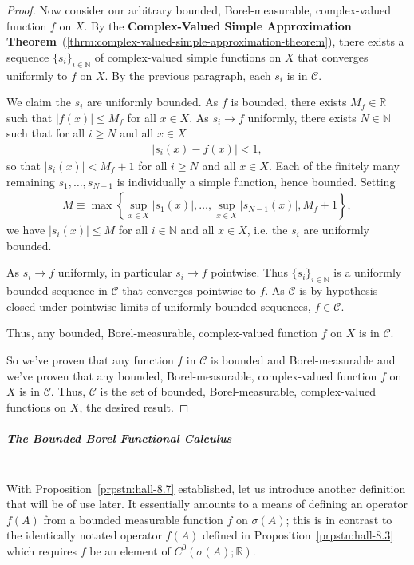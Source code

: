\begin{proof}
Now consider our arbitrary bounded, Borel-measurable, complex-valued function $f$ on $X$. By the \textbf{Complex-Valued Simple Approximation Theorem}~(\ref{thrm:complex-valued-simple-approximation-theorem}), there exists a sequence $\{ s_i \}_{i \in \mathbb{N}}$ of complex-valued simple functions on $X$ that converges uniformly to $f$ on $X$. By the previous paragraph, each $s_i$ is in $\mathcal{C}$.

We claim the $s_i$ are uniformly bounded. As $f$ is bounded, there exists $M_f \in \mathbb{R}$ such that $\lvert f(x) \rvert \le M_f$ for all $x \in X$. As $s_i \rightarrow f$ uniformly, there exists $N \in \mathbb{N}$ such that for all $i \ge N$ and all $x \in X$
\begin{align}
    \lvert s_i(x) - f(x) \rvert < 1,
\end{align}
so that $\lvert s_i(x) \rvert < M_f + 1$ for all $i \ge N$ and all $x \in X$. Each of the finitely many remaining $s_1, \ldots, s_{N-1}$ is individually a simple function, hence bounded. Setting
\begin{align}
    M \equiv \max \left\{ \sup_{x \in X} \lvert s_1(x) \rvert, \ldots, \sup_{x \in X} \lvert s_{N-1}(x) \rvert, M_f + 1 \right\},
\end{align}
we have $\lvert s_i(x) \rvert \le M$ for all $i \in \mathbb{N}$ and all $x \in X$, i.e. the $s_i$ are uniformly bounded.

As $s_i \rightarrow f$ uniformly, in particular $s_i \rightarrow f$ pointwise. Thus $\{ s_i \}_{i \in \mathbb{N}}$ is a uniformly bounded sequence in $\mathcal{C}$ that converges pointwise to $f$. As $\mathcal{C}$ is by hypothesis closed under pointwise limits of uniformly bounded sequences, $f \in \mathcal{C}$.

Thus, any bounded, Borel-measurable, complex-valued function $f$ on $X$ is in $\mathcal{C}$.

So we've proven that any function $f$ in $\mathcal{C}$ is bounded and Borel-measurable and we've proven that any bounded, Borel-measurable, complex-valued function $f$ on $X$ is in $\mathcal{C}$. Thus, $\mathcal{C}$ is the set of bounded, Borel-measurable, complex-valued functions on $X$, the desired result.
\end{proof}

\subparagraph{The Bounded Borel Functional Calculus}\mbox{}\\
With Proposition~\ref{prpstn:hall-8.7} established, let us introduce another definition that will be of use later. It essentially amounts to a means of defining an operator $f(A)$ from a bounded measurable function $f$ on $\sigma(A)$; this is in contrast to the identically notated operator $f(A)$ defined in Proposition~\ref{prpstn:hall-8.3} which requires $f$ be an element of $C^0(\sigma(A); \mathbb{R})$.

